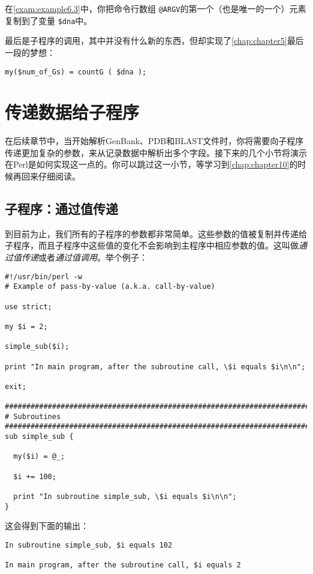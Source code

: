 在\autoref{exam:example6.3}中，你把命令行数组 \verb|@ARGV|的第一个（也是唯一的一个）元素复制到了变量 \verb|$dna|中。

最后是子程序的调用，其中并没有什么新的东西，但却实现了\autoref{chap:chapter5}最后一段的梦想：

\begin{lstlisting}
my($num_of_Gs) = countG ( $dna );
\end{lstlisting}

\section{传递数据给子程序}
在后续章节中，当开始解析GenBank、PDB和BLAST文件时，你将需要向子程序传递更加复杂的参数，来从记录数据中解析出多个字段。接下来的几个小节将演示在Perl是如何实现这一点的。你可以跳过这一小节，等学习到\autoref{chap:chapter10}的时候再回来仔细阅读。

\subsection{子程序：通过值传递}
\label{sect:section6.4.1}
到目前为止，我们所有的子程序的参数都非常简单。这些参数的值被复制并传递给子程序，而且子程序中这些值的变化不会影响到主程序中相应参数的值。这叫做\textit{通过值传递}或者\textit{通过值调用}。举个例子：

\begin{lstlisting}
#!/usr/bin/perl -w
# Example of pass-by-value (a.k.a. call-by-value)

use strict;

my $i = 2;

simple_sub($i);

print "In main program, after the subroutine call, \$i equals $i\n\n";

exit;

################################################################################
# Subroutines
################################################################################
sub simple_sub {

  my($i) = @_;

  $i += 100;

  print "In subroutine simple_sub, \$i equals $i\n\n";
}
\end{lstlisting}

这会得到下面的输出：

\begin{lstlisting}
In subroutine simple_sub, $i equals 102

In main program, after the subroutine call, $i equals 2
\end{lstlisting}

